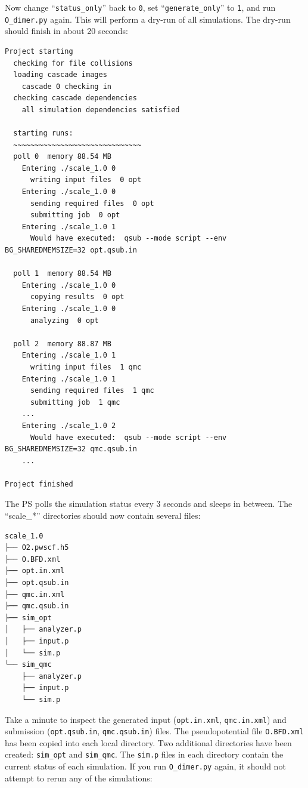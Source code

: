 Now change ``\texttt{status\_only}'' back to \texttt{0}, set ``\texttt{generate\_only}'' to \texttt{1}, and run \texttt{O\_dimer.py} again.  This will perform a dry-run of all simulations.  The dry-run should finish in about 20 seconds:
\begin{shaded}
\begin{verbatim}
Project starting 
  checking for file collisions 
  loading cascade images 
    cascade 0 checking in 
  checking cascade dependencies 
    all simulation dependencies satisfied 
  
  starting runs:
  ~~~~~~~~~~~~~~~~~~~~~~~~~~~~~~ 
  poll 0  memory 88.54 MB 
    Entering ./scale_1.0 0 
      writing input files  0 opt 
    Entering ./scale_1.0 0 
      sending required files  0 opt 
      submitting job  0 opt 
    Entering ./scale_1.0 1 
      Would have executed:  qsub --mode script --env BG_SHAREDMEMSIZE=32 opt.qsub.in 

  poll 1  memory 88.54 MB 
    Entering ./scale_1.0 0 
      copying results  0 opt 
    Entering ./scale_1.0 0 
      analyzing  0 opt 

  poll 2  memory 88.87 MB 
    Entering ./scale_1.0 1 
      writing input files  1 qmc 
    Entering ./scale_1.0 1 
      sending required files  1 qmc 
      submitting job  1 qmc 
    ...
    Entering ./scale_1.0 2 
      Would have executed:  qsub --mode script --env BG_SHAREDMEMSIZE=32 qmc.qsub.in 
    ...

Project finished
\end{verbatim}
\end{shaded}
\noindent
The PS polls the simulation status every 3 seconds and sleeps in between.  The ``scale\_*'' directories should now contain several files:
\begin{shaded}
\begin{verbatim}
scale_1.0
├── O2.pwscf.h5
├── O.BFD.xml
├── opt.in.xml
├── opt.qsub.in
├── qmc.in.xml
├── qmc.qsub.in
├── sim_opt
│   ├── analyzer.p
│   ├── input.p
│   └── sim.p
└── sim_qmc
    ├── analyzer.p
    ├── input.p
    └── sim.p
\end{verbatim}
\end{shaded}
\noindent
Take a minute to inspect the generated input (\texttt{opt.in.xml}, \texttt{qmc.in.xml}) and submission (\texttt{opt.qsub.in}, \texttt{qmc.qsub.in}) files.  The pseudopotential file \texttt{O.BFD.xml} has been copied into each local directory. Two additional directories have been created: \texttt{sim\_opt} and \texttt{sim\_qmc}.  The \texttt{sim.p} files in each directory contain the current status of each simulation.  If you run \texttt{O\_dimer.py} again, it should not attempt to rerun any of the simulations:   

